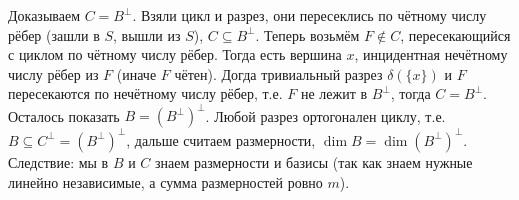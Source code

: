 Доказываем $C=B^\bot$.
Взяли цикл и разрез, они пересеклись по чётному числу рёбер (зашли в $S$, вышли из $S$),
$C\subseteq B^\bot$.
Теперь возьмём $F\notin C$, пересекающийся с циклом по чётному числу рёбер.
Тогда есть вершина $x$, инцидентная нечётному числу рёбер из $F$ (иначе $F$ чётен).
Догда тривиальный разрез $\delta(\{x\})$ и $F$ пересекаются по нечётному числу рёбер,
т.е. $F$ не лежит в $B^\bot$, тогда $C=B^\bot$.
Осталось показать $B=(B^\bot)^\bot$.
Любой разрез ортогонален циклу, т.е. $B\subseteq C^\bot = (B^\bot)^\bot$,
дальше считаем размерности, $\dim B = \dim (B^\bot)^\bot$.
Следствие: мы в $B$ и $C$ знаем размерности и базисы (так как знаем нужные линейно независимые,
а сумма размерностей ровно $m$).

\section{} %

\section{} %

\section{} %
